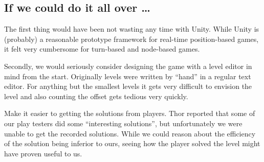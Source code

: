 

\subsection{If we could do it all over \ldots}
The first thing would have been not wasting any time with Unity.
While Unity is (probably) a reasonable prototype framework for
real-time position-based games, it felt very cumbersome for turn-based
and node-based games.

Secondly, we would seriously consider designing the game with a level
editor in mind from the start.  Originally levels were written by
``hand'' in a regular text editor.  For anything but the smallest
levels it gets very difficult to envision the level and also counting
the offset gets tedious very quickly.

Make it easier to getting the solutions from players.  Thor reported
that some of our play testers did some ``interesting solutions'', but
unfortunately we were unable to get the recorded solutions.  While we
could reason about the efficiency of the solution being inferior to
ours, seeing how the player solved the level might have proven useful
to us.

